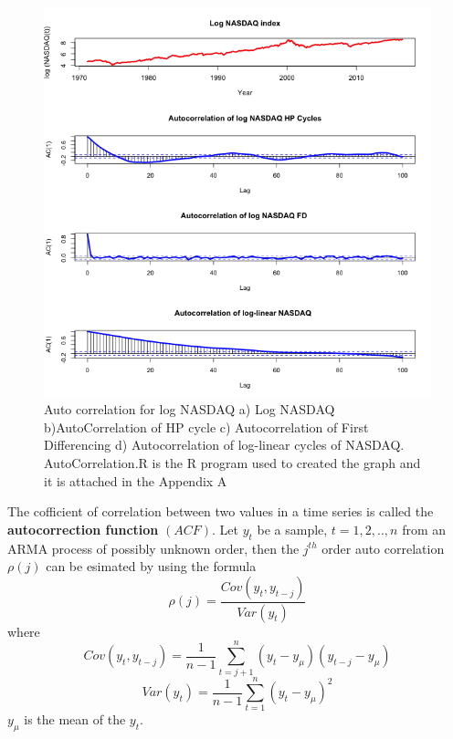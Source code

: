 \begin{figure}[!ht]
\centering
\includegraphics[scale=.65]{Images/ACNASDAQ}
\caption{Auto correlation for log NASDAQ a) Log NASDAQ b)AutoCorrelation of HP cycle  c) Autocorrelation of First Differencing d) Autocorrelation of log-linear cycles of NASDAQ. AutoCorrelation.R is the R program used to created the graph and it is attached in the Appendix A}
\label{fig:ACNASDAQ}
\end{figure}
The cofficient of correlation between two values in a time series is called the \textbf{autocorrection function} $(ACF)$. Let $y_t$ be a sample, $t = 1,2,..,n$ from an ARMA process of possibly unknown order, then the $j^{th}$ order auto correlation $\rho(j)$ can be esimated by using the formula
\begin{equation}
\rho(j) = \frac{Cov(y_t,y_{t-j})}{Var(y_t)}
\end{equation}
where
\begin{equation}
Cov(y_t,y_{t-j}) = \frac{1}{n-1} \sum_{t=j+1}^{n}(y_t-y_\mu)(y_{t-j}-y_\mu)
\end{equation}
\begin{equation}
Var(y_t)= \frac{1}{n-1} \sum_{t=1}^{n}(y_t-y_\mu)^2
\end{equation}
$y_\mu$ is the mean of the $y_t$.
